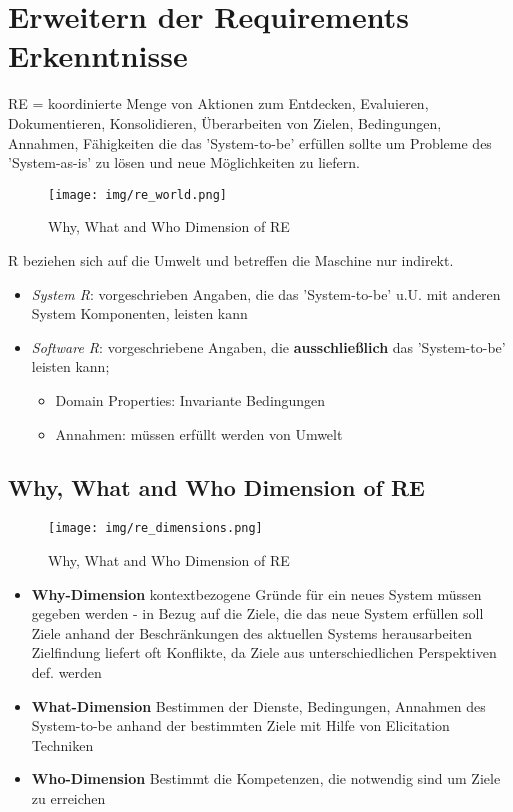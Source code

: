 \section{Erweitern der Requirements Erkenntnisse}
RE = koordinierte Menge von Aktionen zum Entdecken, Evaluieren, Dokumentieren, Konsolidieren, Überarbeiten von Zielen, Bedingungen, Annahmen, Fähigkeiten die das 'System-to-be' erfüllen sollte um Probleme des 'System-as-is' zu lösen und neue Möglichkeiten zu liefern.

\begin{figure}[h]
	\centering
	\texttt{[image: img/re\_world.png]}
	\caption{Why, What and Who Dimension of RE}
	\label{re_world}
\end{figure}

R beziehen sich auf die Umwelt und betreffen die Maschine nur indirekt.
\begin{itemize}
	\item \textit{System R}: vorgeschrieben Angaben, die das 'System-to-be' u.U. mit anderen System Komponenten, leisten kann
	\item \textit{Software R}: vorgeschriebene Angaben, die \textbf{ausschließlich} das 'System-to-be' leisten kann;
	\begin{itemize}
		\item Domain Properties: Invariante Bedingungen 
		\item Annahmen: müssen erfüllt werden von Umwelt
	\end{itemize}
\end{itemize}

\subsection{Why, What and Who Dimension of RE}
\begin{figure}[h]
	\centering
	\texttt{[image: img/re\_dimensions.png]}
	\caption{Why, What and Who Dimension of RE}
\end{figure}
\begin{itemize}
	\item \textbf{Why-Dimension} kontextbezogene Gründe für ein neues System müssen gegeben werden - in Bezug auf die Ziele, die das neue System erfüllen soll\\
	Ziele anhand der Beschränkungen des aktuellen Systems herausarbeiten\\
	Zielfindung liefert oft Konflikte, da Ziele aus unterschiedlichen Perspektiven def. werden
	
	\item \textbf{What-Dimension} Bestimmen der Dienste, Bedingungen, Annahmen des System-to-be anhand der bestimmten Ziele mit Hilfe von Elicitation Techniken
	
	\item \textbf{Who-Dimension} Bestimmt die Kompetenzen, die notwendig sind um Ziele zu erreichen
\end{itemize}
\newpage
